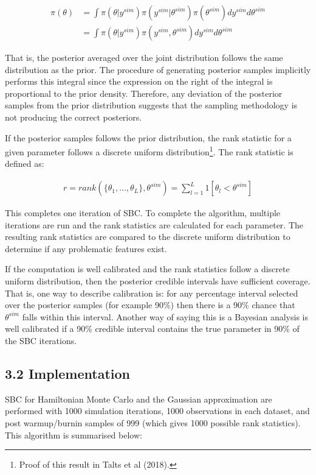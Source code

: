\documentclass[
  12pt,
  letterpaper,
  DIV=11,
  numbers=noendperiod]{scrartcl}
\begin{document}
\[
\begin{aligned}
\pi(\theta) &= \int \pi(\theta|y^{sim}) \pi(y^{sim}|\theta^{sim}) \pi(\theta^{sim})dy^{sim} d\theta^{sim} \\
&= \int \pi(\theta|y^{sim}) \pi(y^{sim},\theta^{sim}) dy^{sim} d\theta^{sim}
\end{aligned}
\]

That is, the posterior averaged over the joint distribution follows the
same distribution as the prior. The procedure of generating posterior
samples implicitly performs this integral since the expression on the
right of the integral is proportional to the prior density. Therefore,
any deviation of the posterior samples from the prior distribution
suggests that the sampling methodology is not producing the correct
posteriors.

If the posterior samples follows the prior distribution, the rank
statistic for a given parameter follows a discrete uniform
distribution\footnote{Proof of this result in Talts et al (2018).}. The
rank statistic is defined as:

\[
\begin{aligned}
r = rank(\{\theta_1,\dots , \theta_{L}\}, \theta^{sim}) = \sum_{l=1}^{L}1[\theta_{l} < \theta^{sim}]
\end{aligned}
\]

This completes one iteration of SBC. To complete the algorithm, multiple
iterations are run and the rank statistics are calculated for each
parameter. The resulting rank statistics are compared to the discrete
uniform distribution to determine if any problematic features exist.

If the computation is well calibrated and the rank statistics follow a
discrete uniform distribution, then the posterior credible intervals
have sufficient coverage. That is, one way to describe calibration is:
for any percentage interval selected over the posterior samples (for
example 90\%) then there is a 90\% chance that \(\theta^{sim}\) falls
within this interval. Another way of saying this is a Bayesian analysis
is well calibrated if a 90\% credible interval contains the true
parameter in 90\% of the SBC iterations.

\hypertarget{implementation}{%
\subsection{3.2 Implementation}\label{implementation}}

SBC for Hamiltonian Monte Carlo and the Gaussian approximation are
performed with 1000 simulation iterations, 1000 observations in each
dataset, and post warmup/burnin samples of 999 (which gives 1000
possible rank statistics). This algorithm is summarised below:
\end{document}
